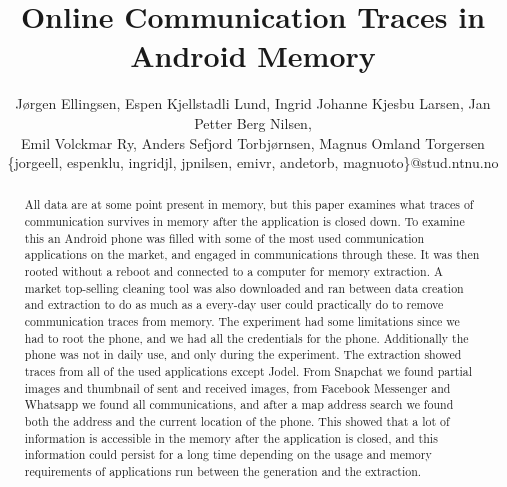 \documentclass[10pt]{sig-alternate-05-2015}
\begin{document}
\title{Online Communication Traces in Android Memory}

\author{
J{\o}rgen Ellingsen, Espen Kjellstadli Lund, Ingrid Johanne Kjesbu Larsen, Jan Petter Berg Nilsen,\\
Emil Volckmar Ry, Anders Sefjord Torbj{\o}rnsen, Magnus Omland Torgersen
\\\{jorgeell, espenklu, ingridjl, jpnilsen, emivr, andetorb, magnuoto\}@stud.ntnu.no
}

\maketitle
\begin{abstract}
All data are at some point present in memory, but this paper examines what traces of communication survives in memory after the application is closed down. To examine this an Android phone was filled with some of the most used communication applications on the market, and engaged in communications through these. It was then rooted without a reboot and connected to a computer for memory extraction. A market top-selling cleaning tool was also downloaded and ran between data creation and extraction to do as much as a every-day user could practically do to remove communication traces from memory. The experiment had some limitations since we had to root the phone, and we had all the credentials for the phone. Additionally the phone was not in daily use, and only during the experiment. The extraction showed traces from all of the used applications except Jodel. From Snapchat we found partial images and thumbnail of sent and received images, from Facebook Messenger and Whatsapp we found all communications, and after a map address search we found both the address and the current location of the phone. This showed that a lot of information is accessible in the memory after the application is closed, and this information could persist for a long time depending on the usage and memory requirements of applications run between the generation and the extraction. 
\end{abstract}
















  
\end{document}
